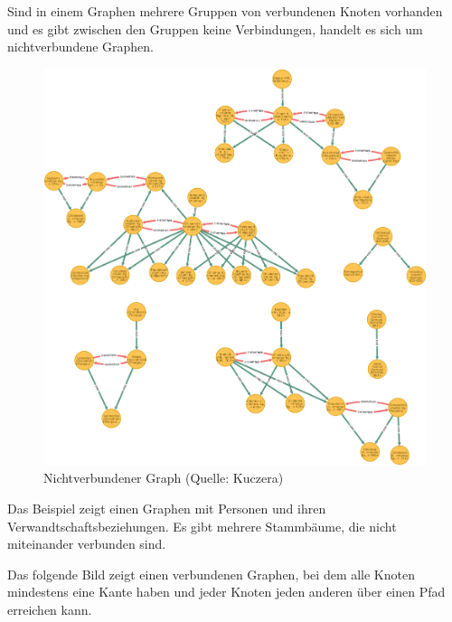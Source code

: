 \documentclass[ngerman,]{scrreprt}
\begin{document}
Sind in einem Graphen mehrere Gruppen von verbundenen Knoten vorhanden und es gibt zwischen den Gruppen keine Verbindungen, handelt es sich um nichtverbundene Graphen.

\begin{figure}
\centering
\includegraphics{Bilder/disconnectedGraph.png}
\caption{Nichtverbundener Graph (Quelle: Kuczera)}
\end{figure}

Das Beispiel zeigt einen Graphen mit Personen und ihren Verwandtschaftsbeziehungen. Es gibt mehrere Stammbäume, die nicht miteinander verbunden sind.

Das folgende Bild zeigt einen verbundenen Graphen, bei dem alle Knoten mindestens eine Kante haben und jeder Knoten jeden anderen über einen Pfad erreichen kann.
\end{document}
